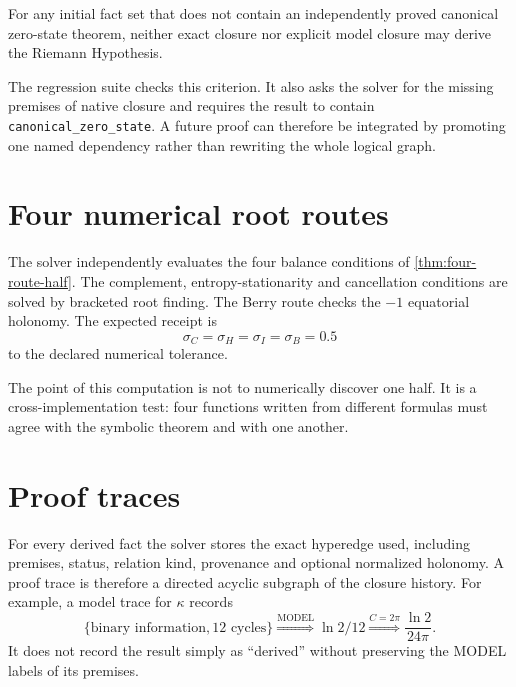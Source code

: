 \begin{criterion}
\label{crit:rh-firewall}
For any initial fact set that does not contain an independently proved canonical
zero-state theorem, neither exact closure nor explicit model closure may derive
the Riemann Hypothesis.
\end{criterion}

The regression suite checks this criterion.  It also asks the solver for the
missing premises of native closure and requires the result to contain
\texttt{canonical\_zero\_state}.  A future proof can therefore be integrated by
promoting one named dependency rather than rewriting the whole logical graph.

\section{Four numerical root routes}

The solver independently evaluates the four balance conditions of
\cref{thm:four-route-half}.  The complement, entropy-stationarity and
cancellation conditions are solved by bracketed root finding.  The Berry route
checks the $-1$ equatorial holonomy.  The expected receipt is
\begin{equation}
 \sigma_C=\sigma_H=\sigma_I=\sigma_B=0.5
 \label{eq:solver-route-consensus}
\end{equation}
to the declared numerical tolerance.

The point of this computation is not to numerically discover one half.  It is a
cross-implementation test: four functions written from different formulas must
agree with the symbolic theorem and with one another.

\section{Proof traces}

For every derived fact the solver stores the exact hyperedge used, including
premises, status, relation kind, provenance and optional normalized holonomy.
A proof trace is therefore a directed acyclic subgraph of the closure history.
For example, a model trace for $\kappa$ records
\begin{equation}
 \{\text{binary information},12\text{ cycles}\}
 \stackrel{\mathrm{MODEL}}{\Longrightarrow}
 \ln2/12
 \stackrel{C=2\pi}{\Longrightarrow}
 \frac{\ln2}{24\pi}.
 \label{eq:kappa-proof-trace}
\end{equation}
It does not record the result simply as ``derived'' without preserving the
MODEL labels of its premises.

